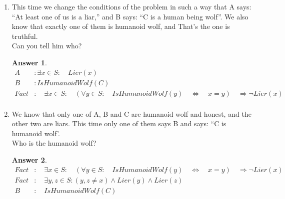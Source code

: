 \documentclass[a4paper]{article}
\renewcommand{\(}{\left(}
\renewcommand{\)}{\right)}
\theoremstyle{plain}
\theoremstyle{plain}
\theoremstyle{definition}
\newtheorem*{answer}{Answer}
\begin{document}
\begin{enumerate}[label*=\alph*.,ref=\alph*]
\item This time we change the conditions of the problem in such a way that A says: ``At least one of us is a liar,'' and B says: ``C is a human being wolf''. We also know that exactly one of them is humanoid wolf, and That's the one is truthful. \\
Can you tell him who?
\begin{shaded}
\begin{answer}
\begin{align*}
 A &:  \exists x \in S : \quad Lier(x) \\
 B &: IsHumanoidWolf(C) \\
  Fact &: \quad \exists x \in S : \quad (\forall y \in S : \quad IsHumanoidWolf(y) \quad \Leftrightarrow \quad x = y) \quad \Rightarrow \neg Lier(x) \\
\end{align*}
\end{answer}
\end{shaded}

\item We know that only one of A, B and C  are humanoid wolf and honest, and the other two are liars. This time only one of them says B and says: ``C is humanoid wolf'.\\
 Who is the humanoid wolf?
\begin{shaded}
\begin{answer}
\begin{align*}
 Fact &: \quad \exists x \in S : \quad (\forall y \in S : \quad IsHumanoidWolf(y) \quad \Leftrightarrow \quad x = y) \quad \Rightarrow \neg Lier(x) \\
 Fact &: \quad \exists y , z \in S : (y , z \neq x ) \wedge Lier(y) \wedge Lier(z) \\
 B &: \quad IsHumanoidWolf(C)
\end{align*}
\end{answer}
\end{shaded}

\end{enumerate}
\end{document}
